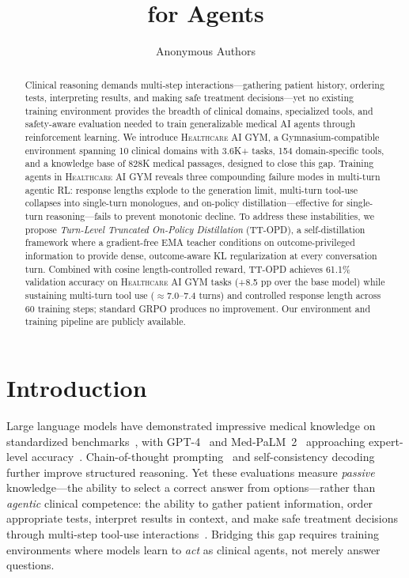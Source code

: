 \documentclass{article}
\title{\gym{} for Agents}
\author{%
  Anonymous Authors \\
}
\newcommand{\gym}{\textsc{Healthcare AI GYM}}
\begin{document}
\maketitle

\begin{abstract}
Clinical reasoning demands multi-step interactions---gathering patient history, ordering tests, interpreting results, and making safe treatment decisions---yet no existing training environment provides the breadth of clinical domains, specialized tools, and safety-aware evaluation needed to train generalizable medical AI agents through reinforcement learning. We introduce \gym{}, a Gymnasium-compatible environment spanning 10 clinical domains with 3.6K+ tasks, 154 domain-specific tools, and a knowledge base of 828K medical passages, designed to close this gap. Training agents in \gym{} reveals three compounding failure modes in multi-turn agentic RL: response lengths explode to the generation limit, multi-turn tool-use collapses into single-turn monologues, and on-policy distillation---effective for single-turn reasoning---fails to prevent monotonic decline. To address these instabilities, we propose \emph{Turn-Level Truncated On-Policy Distillation} (TT-OPD), a self-distillation framework where a gradient-free EMA teacher conditions on outcome-privileged information to provide dense, outcome-aware KL regularization at every conversation turn. Combined with cosine length-controlled reward, TT-OPD achieves 61.1\% validation accuracy on \gym{} tasks (+8.5 pp over the base model) while sustaining multi-turn tool use ($\approx$7.0--7.4 turns) and controlled response length across 60 training steps; standard GRPO produces no improvement. Our environment and training pipeline are publicly available.
\end{abstract}

\section{Introduction}
\label{sec:intro}

Large language models have demonstrated impressive medical knowledge on standardized benchmarks~\citep{jin2021medqa, hendrycks2021mmlu, pal2022medmcqa}, with GPT-4~\citep{nori2023gpt4} and Med-PaLM~2~\citep{singhal2023medpalm2} approaching expert-level accuracy~\citep{thirunavukarasu2023medicalai}. Chain-of-thought prompting~\citep{wei2022cot} and self-consistency decoding~\citep{wang2023selfconsistency} further improve structured reasoning. Yet these evaluations measure \emph{passive} knowledge---the ability to select a correct answer from options---rather than \emph{agentic} clinical competence: the ability to gather patient information, order appropriate tests, interpret results in context, and make safe treatment decisions through multi-step tool-use interactions~\citep{yao2023react}. Bridging this gap requires training environments where models learn to \emph{act} as clinical agents, not merely answer questions.
\end{document}
